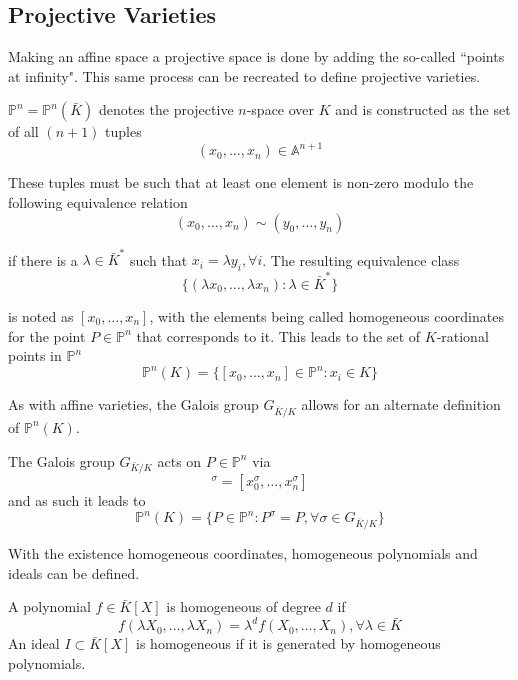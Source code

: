 \subsection{Projective Varieties}
Making an affine space a projective space is done by adding the so-called ``points at infinity". This same process can be recreated to define projective varieties.
\begin{defn}
	$\mathbb{P}^n=\mathbb{P}^n(\bar{K})$ denotes the projective $n$-space over $K$ and is constructed as the set of all $(n+1)$ tuples
	\begin{equation*}
	(x_0,\dots,x_n)\in\mathbb{A}^{n+1}
	\end{equation*}
	
	These tuples must be such that at least one element is non-zero modulo the following equivalence relation
	\begin{equation*}
	(x_0,\dots,x_n)\sim(y_0,\dots,y_n)
	\end{equation*}
	
	if there is a $\lambda\in\bar{K}^*$ such that $x_i=\lambda y_i,\forall i$. The resulting equivalence class
	\begin{equation*}
	\{(\lambda x_0,\dots,\lambda x_n):\lambda\in\bar{K}^*\}
	\end{equation*}
	
	is noted as $[x_0,\dots,x_n]$, with the elements being called homogeneous coordinates for the point $P\in\mathbb{P}^n$ that corresponds to it. This leads to the set of $K$-rational points in $\mathbb{P}^n$
	\begin{equation*}
	\mathbb{P}^n(K)=\{[x_0,\dots,x_n]\in\mathbb{P}^n:x_i\in K\}
	\end{equation*}
\end{defn}
As with affine varieties, the Galois group $G_{\bar{K}/K}$ allows for an alternate definition of $\mathbb{P}^n(K)$.
\begin{rem}
	The Galois group $G_{\bar{K}/K}$ acts on $P\in\mathbb{P}^n$ via
	\begin{equation*}
	[x_0,\dots,x_n]^\sigma=[x_0^\sigma,\dots,x_n^\sigma]
	\end{equation*}
	and as such it leads to
	\begin{equation*}
	\mathbb{P}^n(K)=\{P\in\mathbb{P}^n:P^\sigma=P,\forall\sigma\in G_{\bar{K}/K}\}
	\end{equation*}
\end{rem}

With the existence homogeneous coordinates, homogeneous polynomials and ideals can be defined.
\begin{defn}
	A polynomial $f\in\bar{K}[X]$ is homogeneous of degree $d$ if
	\begin{equation*}
	f(\lambda X_0,\dots,\lambda X_n)=\lambda^df(X_0,\dots,X_n),\forall \lambda\in\bar{K}
	\end{equation*}
	An ideal $I\subset\bar{K}[X]$ is homogeneous if it is generated by homogeneous polynomials.
\end{defn}


